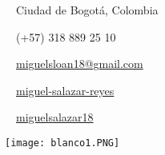 \documentclass[paper=a4,fontsize=9.0pt]{temp} %
\begin{document}
\begin{minipage}{0.28\linewidth}
  
\vspace{1.0mm}

   {\faMapMarker \ \  Ciudad de Bogotá, Colombia} 

   {\faMobile \ \  {(+57) 318 889 25 10}}
   
   {\faEnvelope \ \  \href{mailto:miguelsloan18@gmail.com}{miguelsloan18@gmail.com}}
      
   
   {\faLinkedinSquare \ \  \href{https://www.linkedin.com/in/miguel-salazar-reyes/}{miguel-salazar-reyes}}
   
{\faGithub  \ \  \href{https://github.com/miguelsalazar18}{miguelsalazar18}}

\end{minipage}
\hspace{25.0mm}
\begin{minipage}{0.49\linewidth}
 \hfill{\texttt{[image: blanco1.PNG]}}
\end{minipage}
\end{document}
